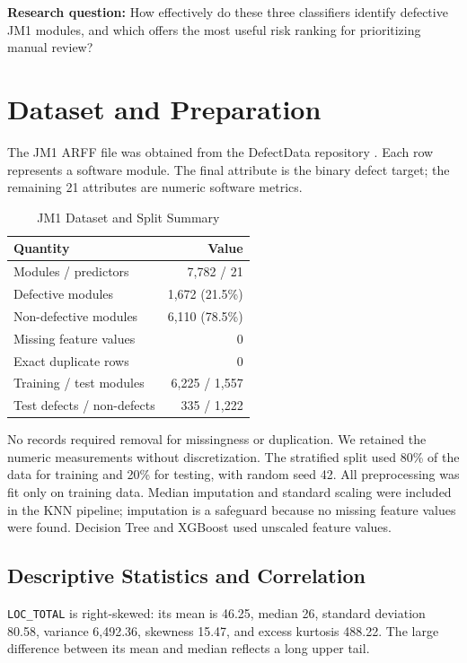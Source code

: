 \documentclass[conference]{IEEEtran}
\begin{document}
\textbf{Research question:} How effectively do these three classifiers identify defective JM1 modules, and which offers the most useful risk ranking for prioritizing manual review?

\section{Dataset and Preparation}
The JM1 ARFF file was obtained from the DefectData repository \cite{defectdata,loader}. Each row represents a software module. The final attribute is the binary defect target; the remaining 21 attributes are numeric software metrics.

\begin{table}[t]
\caption{JM1 Dataset and Split Summary}
\label{tab:dataset}
\centering
\footnotesize
\begin{tabular}{lr}
\toprule
\textbf{Quantity} & \textbf{Value}\\
\midrule
Modules / predictors & 7,782 / 21\\
Defective modules & 1,672 (21.5\%)\\
Non-defective modules & 6,110 (78.5\%)\\
Missing feature values & 0\\
Exact duplicate rows & 0\\
Training / test modules & 6,225 / 1,557\\
Test defects / non-defects & 335 / 1,222\\
\bottomrule
\end{tabular}
\end{table}

No records required removal for missingness or duplication. We retained the numeric measurements without discretization. The stratified split used 80\% of the data for training and 20\% for testing, with random seed 42. All preprocessing was fit only on training data. Median imputation and standard scaling were included in the KNN pipeline; imputation is a safeguard because no missing feature values were found. Decision Tree and XGBoost used unscaled feature values.

\subsection{Descriptive Statistics and Correlation}
\texttt{LOC\_TOTAL} is right-skewed: its mean is 46.25, median 26, standard deviation 80.58, variance 6,492.36, skewness 15.47, and excess kurtosis 488.22. The large difference between its mean and median reflects a long upper tail.
\end{document}

